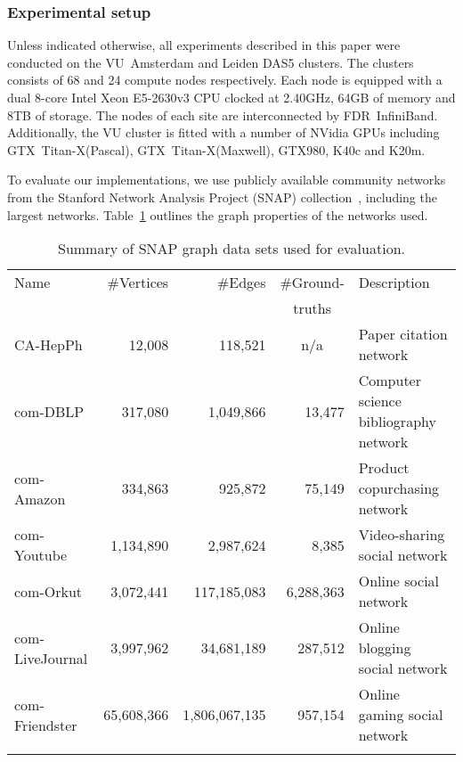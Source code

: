 \subsubsection{Experimental setup}
\label{sec-experimental}

Unless indicated otherwise, all experiments described in this paper
were conducted on the VU~Amsterdam and Leiden DAS5 clusters.  The clusters
consists of 68 and 24 compute nodes respectively. Each node is equipped with
a dual 8-core Intel Xeon E5-2630v3 CPU clocked at 2.40GHz, 64GB of memory and
8TB of storage. The nodes of each site are interconnected by FDR~InfiniBand.
Additionally, the VU cluster is fitted with a number of NVidia GPUs including
GTX~\mbox{Titan-X(Pascal)},
GTX~\mbox{Titan-X(Maxwell)}, GTX980, K40c and K20m.

To evaluate our implementations, we use publicly available
community networks from the Stanford Network Analysis Project (SNAP)
collection~\cite{snapnets}, including the largest networks.
Table~\ref{table-snap}
outlines the graph properties of the networks used.

\begin{table}
  \centering
  \def\tabcolsep{0.2em}
  \begin{tabular}{l r r r p{9em}}
    Name            & \#Vertices &       \#Edges & \multicolumn{1}{c}{\#Ground-} & Description \\
                    &            &               & \multicolumn{1}{c}{truths}    &             \\
    \hline
    CA-HepPh        &    12,008  &    118,521    & \multicolumn{1}{c}{n/a}       & Paper citation network \\
    com-DBLP        &    317,080 &     1,049,866 & 13,477         & Computer science bibliography network \\
    com-Amazon      &    334,863 &       925,872 & 75,149         & Product copurchasing network \\
    com-Youtube     &  1,134,890 &     2,987,624 & 8,385          & Video-sharing social network \\
    com-Orkut       &  3,072,441 &   117,185,083 & 6,288,363      & Online social network \\
    com-LiveJournal &  3,997,962 &    34,681,189 & 287,512        & Online blogging social network \\
    com-Friendster  & 65,608,366 & 1,806,067,135 & 957,154        & Online gaming social network \\
    \hline
    \\[-1ex]
  \end{tabular}
  \caption{Summary of SNAP graph data sets used for evaluation.}
  \label{table-snap}
\end{table}

